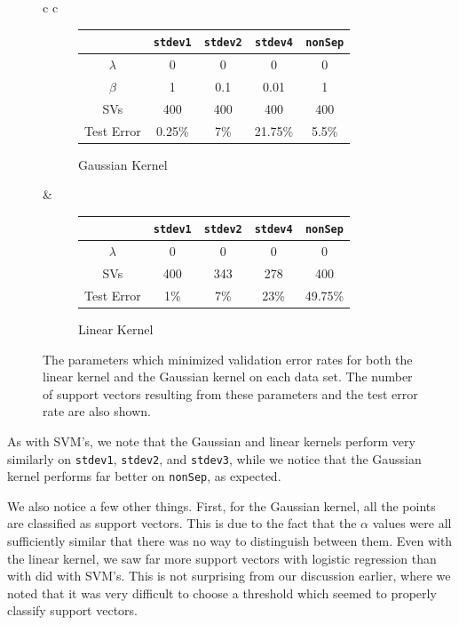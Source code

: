 \documentclass{sigchi}
\begin{document}
\begin{figure}
\centering
\renewcommand*{\arraystretch}{1.5}

\begin{tabular}{c c}
\begin{subfigure}[b]{3.5in}
\centering
	\begin{tabular}{| c | c | c | c | c |}
	\hline
	& \texttt{stdev1} & \texttt{stdev2} & \texttt{stdev4} & \texttt{nonSep}\\
	\hline
	$\lambda$ & 0 & 0 & 0 & 0 \\
	\hline
	$\beta$ & 1 & 0.1 & 0.01 & 1 \\
	\hline
	SVs & 400 & 400 & 400 & 400 \\
	\hline
	Test Error & 0.25\% & 7\% & 21.75\% & 5.5\%  \\
	\hline
	\end{tabular}
	\caption{Gaussian Kernel}
\end{subfigure}
&
\begin{subfigure}[b]{3.5in}
\centering
	\begin{tabular}{| c | c | c | c | c |}
	\hline
	& \texttt{stdev1} & \texttt{stdev2} & \texttt{stdev4} & \texttt{nonSep}\\
	\hline
	$\lambda$ & 0  & 0  & 0  & 0  \\
	\hline
	SVs & 400 & 343 & 278 & 400  \\
	\hline
	Test Error & 1\% & 7\% & 23\% & 49.75\%\\
	\hline
	\end{tabular}
	\caption{Linear Kernel}
\end{subfigure}
\end{tabular}

\caption{The parameters which minimized validation error rates for both the linear kernel and the Gaussian kernel on each data set. The number of support vectors resulting from these parameters and the test error rate are also shown.}
\end{figure}


As with SVM's, we note that the Gaussian and linear kernels perform very similarly on \texttt{stdev1}, \texttt{stdev2}, and \texttt{stdev3}, while we notice that the Gaussian kernel performs far better on \texttt{nonSep}, as expected.

We also notice a few other things. First, for the Gaussian kernel, all the points are classified as support vectors. This is due to the fact that the $\alpha$ values were all sufficiently similar that there was no way to distinguish between them. Even with the linear kernel, we saw far more support vectors with logistic regression than with did with SVM's. This is not surprising from our discussion earlier, where we noted that it was very difficult to choose a threshold which seemed to properly classify support vectors.
\end{document}
